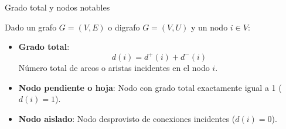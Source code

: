 \documentclass[
  ignorenonframetext,
]{beamer}
\providecommand{\tightlist}{%
  \setlength{\itemsep}{0pt}\setlength{\parskip}{0pt}}
\begin{document}
\begin{frame}{Grado total y nodos notables}
\label{grado-total-y-nodos-notables}
\begin{tcolorbox}[enhanced jigsaw, left=2mm, opacityback=0, titlerule=0mm, breakable, toptitle=1mm, rightrule=.15mm, bottomtitle=1mm, coltitle=black, title=\textcolor{quarto-callout-note-color}{\faInfo}\hspace{0.5em}{Definición: Grado total y nodos notables}, colframe=quarto-callout-note-color-frame, colbacktitle=quarto-callout-note-color!10!white, arc=.35mm, toprule=.15mm, leftrule=.75mm, bottomrule=.15mm, opacitybacktitle=0.6, colback=white]

Dado un grafo \(G = (V, E)\) o digrafo \(G = (V, U)\) y un nodo
\(i \in V\):

\begin{itemize}
\tightlist
\item
  \textbf{Grado total}: \[d(i) = d^+(i) + d^-(i)\] Número total de arcos
  o aristas incidentes en el nodo \(i\).
\item
  \textbf{Nodo pendiente o hoja}: Nodo con grado total exactamente igual
  a 1 (\(d(i) = 1\)).
\item
  \textbf{Nodo aislado}: Nodo desprovisto de conexiones incidentes
  (\(d(i) = 0\)).
\end{itemize}

\end{tcolorbox}
\end{frame}
\end{document}
